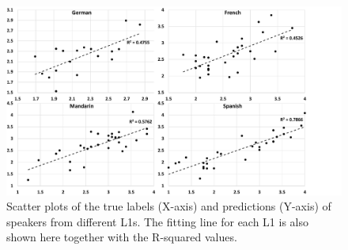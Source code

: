 
\begin{figure}[t]
        \begin{minipage}[t]{1.0\linewidth}
        \centering
            \includegraphics[width=5.0in]{figures/allspk_results_scatter_L1s.pdf}
        \end{minipage}%
        \caption{Scatter plots of the true labels (X-axis) and predictions (Y-axis) of speakers from different L1s. The fitting line for each L1 is also shown here together with the R-squared values.}
        \centering
        \label{fig:allspk_results_scatter}
     \end{figure}


